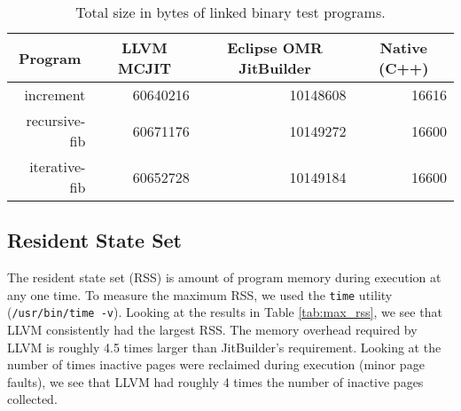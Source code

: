 \begin{table*}[t]
  \begin{tabular}{|r|l|l|l|} 
  \hline
  \multicolumn{1}{|c|}{\textbf{Program}}
  & \multicolumn{1}{c|}{\textbf{LLVM MCJIT}}                      
  & \multicolumn{1}{c|}{\textbf{Eclipse OMR JitBuilder}}
  & \multicolumn{1}{c|}{\textbf{Native (C++)}}                    
  \\ \hline

  increment                               
  & \multicolumn{1}{r|}{\num{60640216}} %
  & \multicolumn{1}{r|}{\num{10148608}} %
  & \multicolumn{1}{r|}{\num{16616}}    %
  \\ \hline
  
  recursive-fib                           
  & \multicolumn{1}{r|}{\num{60671176}} %
  & \multicolumn{1}{r|}{\num{10149272}} %
  & \multicolumn{1}{r|}{\num{16600}}   %
  \\ \hline
  
  iterative-fib                           
  & \multicolumn{1}{r|}{\num{60652728}} %
  & \multicolumn{1}{r|}{\num{10149184}} %
  & \multicolumn{1}{r|}{\num{16600}}   %
  \\ \hline
  
\end{tabular}
  \caption{Total size in bytes of linked binary test programs.}
  \label{tab:size_in_bytes}
\end{table*}

\subsection{Resident State Set}
The resident state set (RSS) is amount of program memory during execution at any one time.
To measure the maximum RSS, we used the \texttt{time} utility (\texttt{/usr/bin/time -v}).
Looking at the results in Table \ref{tab:max_rss}, we see that LLVM consistently had the largest RSS.
The memory overhead required by LLVM is roughly 4.5 times larger than JitBuilder's requirement.
Looking at the number of times inactive pages were reclaimed during execution (minor page faults), we see that LLVM had roughly 4 times the number of inactive pages collected.

